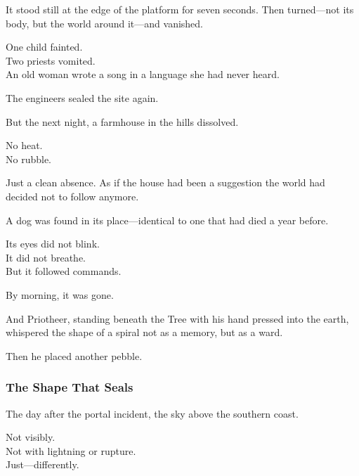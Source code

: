 \documentclass[12pt]{article}
\begin{document}
\vspace{0.5em}
It stood still at the edge of the platform for seven seconds. Then turned---not its body, but the world around it---and vanished.

\vspace{0.5em}
One child fainted.\\
Two priests vomited.\\
An old woman wrote a song in a language she had never heard.

\vspace{0.5em}
The engineers sealed the site again.

\vspace{0.5em}
But the next night, a farmhouse in the hills dissolved.

\vspace{0.5em}
No heat.\\
No rubble.

\vspace{0.5em}
Just a clean absence. As if the house had been a suggestion the world had decided not to follow anymore.

\vspace{0.5em}
A dog was found in its place---identical to one that had died a year before.

\vspace{0.5em}
Its eyes did not blink.\\
It did not breathe.\\
But it followed commands.

\vspace{0.5em}
By morning, it was gone.

\vspace{0.5em}
And Priotheer, standing beneath the Tree with his hand pressed into the earth, whispered the shape of a spiral not as a memory, but as a ward.

\vspace{0.5em}
Then he placed another pebble.

\dotfill

\subsubsection*{The Shape That Seals}

The day after the portal incident, the sky above the southern coast.

\vspace{0.5em}
Not visibly.\\
Not with lightning or rupture.\\
Just---differently.
\end{document}
